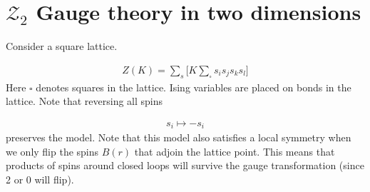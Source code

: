 \documentclass[book.tex]{subfiles}
\begin{document}
\section{$\mathcal{Z}_2$ Gauge theory in two dimensions}

Consider a square lattice. 

\begin{align}
    Z(K) = \sum_s \Bigg [ K \sum_{\square} s_i s_j s_k s_l \Bigg ]
\end{align}
Here $\square$ denotes squares in the lattice. Ising variables are placed on bonds in the lattice. Note that reversing all spins

\begin{align}
    s_i \mapsto -s_i
\end{align}
preserves the model. Note that this model also satisfies a local symmetry when we only flip the spins $B(r)$ that adjoin the lattice point. This means that products of spins around closed loops will survive the gauge transformation (since 2 or 0 will flip).
\end{document}
